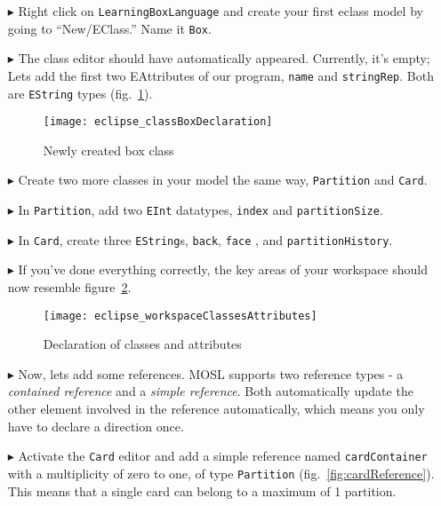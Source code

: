 \begin{itemize}
\item[$\blacktriangleright$] Right click on \texttt{LearningBoxLanguage} and create your first eclass model by going to ``New/EClass.'' Name it \texttt{Box}.

\item[$\blacktriangleright$] The class editor should have automatically appeared. Currently, it's empty; Lets add the first two EAttributes of our program,
\texttt{name} and \texttt{stringRep}. Both are \texttt{EString} types (fig.~\ref{fig:boxDeclaration}).

\begin{figure}[htbp]
	\centering
  \texttt{[image: eclipse\_classBoxDeclaration]}
	\caption{Newly created box class}
	\label{fig:boxDeclaration}
\end{figure} 

\item[$\blacktriangleright$] Create two more classes in your model the same way, \texttt{Partition} and \texttt{Card}.

\item[$\blacktriangleright$] In \texttt{Partition}, add two \texttt{EInt} datatypes, \texttt{index} and \texttt{partitionSize}.

\item[$\blacktriangleright$] In \texttt{Card}, create three \texttt{EString}s, \texttt{back}, \texttt{face} , and \texttt{partitionHistory}.

\item[$\blacktriangleright$] If you've done everything correctly, the key areas of your workspace should now resemble figure~\ref{fig:workspaceClassAttributes}.

\begin{figure}[htbp]
	\centering
  \texttt{[image: eclipse\_workspaceClassesAttributes]}
	\caption{Declaration of classes and attributes}
	\label{fig:workspaceClassAttributes}
\end{figure} 

\item[$\blacktriangleright$] Now, lets add some references. MOSL supports two reference types - a \emph{contained reference} and a \emph{simple reference}. Both
automatically update the other element involved in the reference automatically, which means you only have to declare a direction once.

\item[$\blacktriangleright$] Activate the \texttt{Card} editor and add a simple reference named \texttt{cardContainer} with a multiplicity of zero to one, of
type \texttt{Partition} (fig.~\ref{fig:cardReference}). This means that a single card can belong to a maximum of 1 partition.


\end{itemize}
